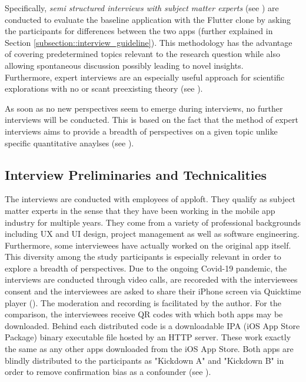 Specifically, \textit{semi structured interviews with subject matter experts} (see \cite{Liebold2009}) are conducted to evaluate the baseline application
with the Flutter clone by asking the participants for differences between the two apps (further explained in Section \ref{subsection::interview_guideline}). This methodology has the
advantage of covering predetermined topics relevant to the research question while also allowing spontaneous discussion possibly leading to novel insights.\\
Furthermore, expert interviews are an especially useful approach for scientific explorations
with no or scant preexisting theory (see \cite{Experts2009}).

As soon as no new perspectives seem to emerge during interviews, no further interviews will be conducted.
This is based on the fact that the method of expert interviews 
aims to provide a breadth of perspectives on a given topic unlike specific quantitative anaylses (see \cite{Liebold2009}).


\subsection{Interview Preliminaries and Technicalities}
The interviews are conducted with employees of apploft. They qualify as subject matter experts in the sense that they have been working in the mobile app industry for multiple years. They come from a variety
of professional backgrounds including UX and UI design, project management as well as software engineering. Furthermore, some interviewees have actually worked on the original app itself. This diversity 
among the study participants is especially relevant in order to explore a breadth of perspectives. 
Due to the ongoing Covid-19 pandemic, the interviews are conducted through video calls, are recoreded with the interviewees consent and the interviewees are asked to share their iPhone screen via Quicktime player (\cite{Apple2014}).
The moderation and recording is facilitated by the author.
For the comparison, the interviewees receive QR codes with which both apps may be downloaded. Behind each distributed code is a downloadable IPA (iOS App Store Package) binary executable file hosted by an HTTP server.
These work exactly the same as any other apps downloaded from the iOS App Store.
Both apps are blindly distributed to the participants as "Kickdown A" and "Kickdown B" in order to remove confirmation bias as a confounder (see \cite{Tversky1974}).

